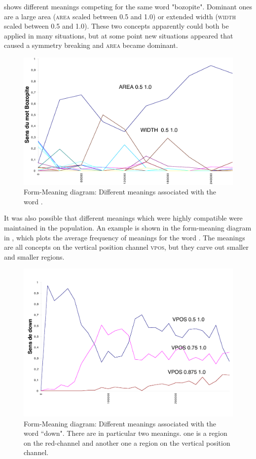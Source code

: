  shows different meanings competing for the same word "bozopite". Dominant ones are 
a large area (\textsc{area} scaled between 0.5 and 1.0) or extended width (\textsc{width} scaled between 0.5 and 1.0). These two concepts
apparently could both be applied in many situations, but at some point new situations appeared that 
caused a symmetry breaking and \textsc{area} became dominant. 

\begin{figure}[htbp]
  \centerline{\includegraphics[width=\textwidth]{chap8/figures/bozopite.pdf}}
\caption{\label{fig:bozopite}Form-Meaning diagram: Different meanings associated with the word . 
}
\end{figure}

It was also possible that different meanings which were highly compatible were maintained in the population. 
An example is shown in the form-meaning diagram in , which plots the average 
frequency of meanings for the word . The meanings are all concepts on the vertical position channel 
\textsc{vpos}, but they carve out smaller and smaller regions. 

\begin{figure}[htbp]
  \centerline{\includegraphics[width=.65\textwidth]{chap8/figures/down.pdf}}
\caption{\label{fig:down}Form-Meaning diagram: Different meanings associated with the word ``down". There are in particular two meanings. 
one is a region on the red-channel and another one a region on the vertical position channel. 
}
\end{figure}

